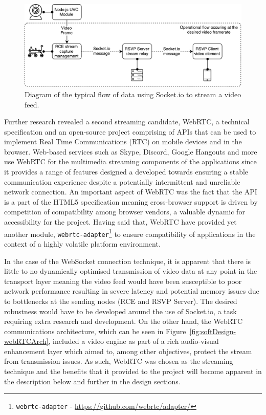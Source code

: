       \begin{figure}[h!]
        \centering
        \includegraphics[width=0.8\linewidth]{figures/softDesign-socketVideoStreaming}
        \caption[Diagram of the typical flow of data using Socket.io to stream a video feed.]{Diagram of the typical flow of data using Socket.io to stream a video feed.}
        \label{fig:softDesign-socketVideoStreaming}
      \end{figure}
      
      Further research revealed a second streaming candidate, WebRTC, a technical specification and an open-source project comprising of APIs that can be used to implement Real Time Communications (RTC) on mobile devices and in the browser. Web-based services such as Skype, Discord, Google Hangouts and more use WebRTC for the multimedia streaming components of the applications since it provides a range of features designed a developed towards ensuring a stable communication experience despite a potentially intermittent and unreliable network connection. An important aspect of WebRTC was the fact that the API is a part of the HTML5 specification meaning cross-browser support is driven by competition of compatibility among browser vendors, a valuable dynamic for accessibility for the project. Having said that, WebRTC have provided yet another module, \texttt{webrtc-adapter}\footnote{\texttt{webrtc-adapter} - \url{https://github.com/webrtc/adapter/}} to ensure compatibility of applications in the context of a highly volatile platform environment.
      
      In the case of the WebSocket connection technique, it is apparent that there is little to no dynamically optimised transmission of video data at any point in the transport layer meaning the video feed would have been susceptible to poor network performance resulting in severe latency and potential memory issues due to bottlenecks at the sending nodes (RCE and RSVP Server). The desired robustness would have to be developed around the use of Socket.io, a task requiring extra research and development. On the other hand, the WebRTC communications architecture, which can be seen in Figure~\ref{fig:softDesign-webRTCArch}, included a video engine as part of a rich audio-visual enhancement layer which aimed to, among other objectives, protect the stream from transmission issues. As such, WebRTC was chosen as the streaming technique and the benefits that it provided to the project will become apparent in the description below and further in the design sections.
      
